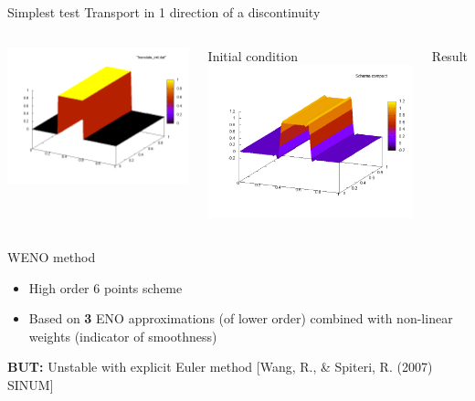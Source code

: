 \documentclass{beamer}
\begin{document}
  \begin{frame}{Simplest test}
    Transport in 1 direction of a discontinuity
    \begin{columns}[c]
        \includegraphics[width=\textwidth]{img/creneau_ci.png}

        Initial condition
        \includegraphics[width=\textwidth]{img/creneau_compact.png}

        Result
    \end{columns}
  \end{frame}

\begin{frame}{WENO method}
    \begin{itemize}
      \item High order 6 points scheme
      \item Based on \textbf{3} ENO approximations (of lower order) combined with non-linear weights (indicator of smoothness)
    \end{itemize}
    \textbf{BUT:} Unstable with explicit Euler method [Wang, R., \& Spiteri, R. (2007) SINUM]
  \end{frame}
\end{document}
